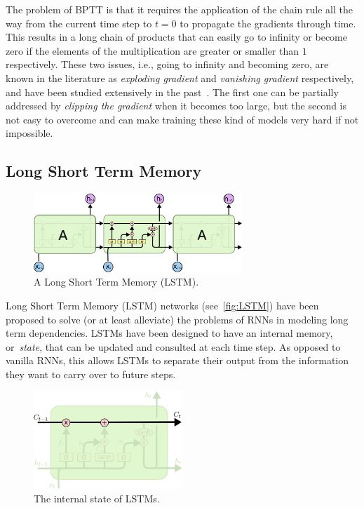 The problem of BPTT is that it requires the application of the chain rule all
the way from the current time step to $t = 0$ to propagate the gradients
through time.  This results in a long chain of products that can easily go to
infinity or become zero if the elements of the multiplication are greater or
smaller than $1$ respectively. These two issues, i.e., going to infinity and
becoming zero, are known in the literature as \emph{exploding gradient} and
\emph{vanishing gradient} respectively, and have been studied extensively in
the past~\citep[see e.g., ][]{Hochreiter91,Bengio-trnn93}. The first one can be
partially addressed by \emph{clipping the gradient} when it becomes too large,
but the second is not easy to overcome and can make training these kind of
models very hard if not impossible.

\subsection{Long Short Term Memory}\label{sec:LSTM}
\begin{figure}[t]
    \centering
    \includegraphics[width=0.7\textwidth]{pdf/LSTM.pdf}
    \caption{A Long Short Term Memory (LSTM).\label{fig:LSTM}}
\end{figure}

Long Short Term Memory (LSTM) networks (see~\autoref{fig:LSTM}) have been
proposed to solve (or at least alleviate) the problems of RNNs in modeling
long term dependencies. LSTMs have been designed to have an internal memory,
or~\emph{state}, that can be updated and consulted at each time step. As
opposed to vanilla RNNs, this allows LSTMs to separate their output from the
information they want to carry over to future steps.

\begin{figure}[t]
    \centering
    \includegraphics[width=0.5\textwidth]{pdf/LSTM_state.pdf}
    \caption{The internal state of LSTMs.\label{fig:LSTM_state}}
\end{figure}

